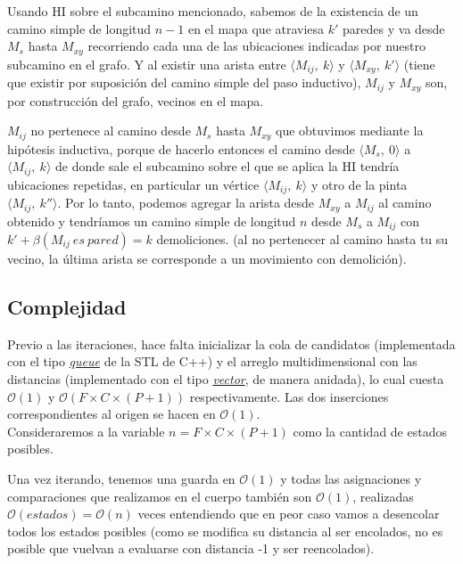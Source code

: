     Usando HI sobre el subcamino mencionado, sabemos de la existencia de un camino simple de longitud $n-1$ en el mapa que atraviesa $k'$ paredes y va desde $M_s$ hasta $M_{xy}$ recorriendo cada una de las ubicaciones indicadas por nuestro subcamino en el grafo. Y al existir una arista entre $\langle {M_{ij},\ k} \rangle$ y $\langle {M_{xy},\ k' } \rangle$ (tiene que existir por suposición del camino simple del paso inductivo), $M_{ij}$ y $M_{xy}$ son, por construcción del grafo, vecinos en el mapa.

    $M_{ij}$ no pertenece al camino desde $M_s$ hasta $M_{xy}$ que obtuvimos mediante la hipótesis inductiva, porque de hacerlo entonces el camino desde $\langle {M_{s},\ 0} \rangle$ a $\langle {M_{ij},\ k} \rangle$ de donde sale el subcamino sobre el que se aplica la HI tendría ubicaciones repetidas, en particular un vértice $\langle {M_{ij},\ k} \rangle$ y otro de la pinta $\langle {M_{ij},\ k''} \rangle$. Por lo tanto, podemos agregar la arista desde $M_{xy}$ a $M_{ij}$ al camino obtenido y tendríamos un camino simple de longitud $n$ desde $M_{s}$ a $M_{ij}$ con $k'+\beta(M_{ij}\ es\ pared) = k$ demoliciones.
    (al no pertenecer al camino hasta tu su vecino, la última arista se corresponde a un movimiento con demolición).
    \QEDB
    \\

\subsection{Complejidad}

    Previo a las iteraciones, hace falta inicializar la cola de candidatos (implementada con el tipo \href{http://www.cs.northwestern.edu/~riesbeck/programming/c++/stl-summary.html#queue}{\emph{queue}} de la STL de C++) y el arreglo multidimensional con las distancias (implementado con el tipo \href{http://www.cs.northwestern.edu/~riesbeck/programming/c++/stl-summary.html#vector}{\emph{vector}}, de manera anidada), lo cual cuesta  $\mathcal{O}(1)$ y  $\mathcal{O}(F\times C\times (P+1))$ respectivamente. Las dos inserciones correspondientes al origen se hacen en $\mathcal{O}(1)$.
    \\

    Consideraremos a la variable $n = F\times C\times (P+1)$ como la cantidad de estados posibles.

    Una vez iterando, tenemos una guarda en $\mathcal{O}(1)$ y todas las asignaciones y comparaciones que realizamos en el cuerpo también son $\mathcal{O}(1)$, realizadas $\mathcal{O}(estados) = \mathcal{O}(n)$ veces entendiendo que en peor caso vamos a desencolar todos los estados posibles (como se modifica su distancia al ser encolados, no es posible que vuelvan a evaluarse con distancia -1 y ser reencolados).
    \\

